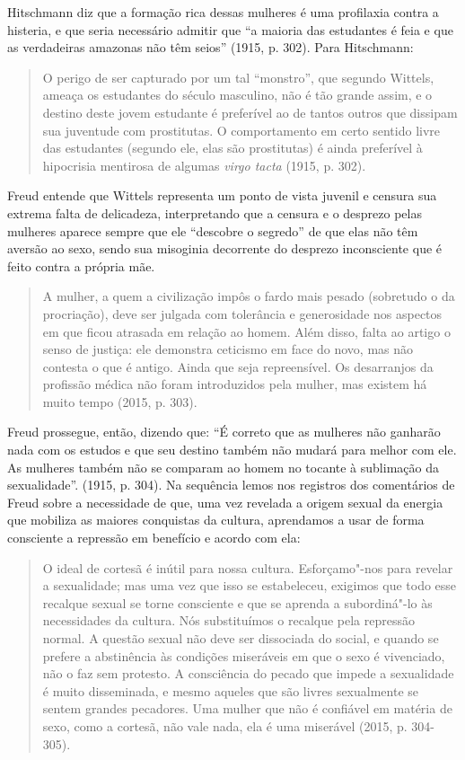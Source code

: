 Hitschmann diz que a formação rica dessas mulheres é uma profilaxia
contra a histeria, e que seria necessário admitir que ``a maioria das
estudantes é feia e que as verdadeiras amazonas não têm seios'' (1915,
p. 302). Para Hitschmann:

\begin{quote}
O perigo de ser capturado por um tal ``monstro'', que segundo Wittels,
ameaça os estudantes do século masculino, não é tão grande assim, e o
destino deste jovem estudante é preferível ao de tantos outros que
dissipam sua juventude com prostitutas. O comportamento em certo sentido
livre das estudantes (segundo ele, elas são prostitutas) é ainda
preferível à hipocrisia mentirosa de algumas \emph{virgo tacta} (1915, p. 302).
\end{quote}

Freud entende que Wittels representa um ponto de vista juvenil e censura
sua extrema falta de delicadeza, interpretando que a censura e o
desprezo pelas mulheres aparece sempre que ele ``descobre o segredo'' de
que elas não têm aversão ao sexo, sendo sua misoginia decorrente do
desprezo inconsciente que é feito contra a própria mãe.

\begin{quote}
A mulher, a quem a civilização impôs o fardo mais pesado (sobretudo o da
procriação), deve ser julgada com tolerância e generosidade nos aspectos
em que ficou atrasada em relação ao homem. Além disso, falta ao artigo o
senso de justiça: ele demonstra ceticismo em face do novo, mas não
contesta o que é antigo. Ainda que seja repreensível. Os desarranjos da
profissão médica não foram introduzidos pela mulher, mas existem há
muito tempo (2015, p. 303).
\end{quote}

Freud prossegue, então, dizendo que: ``É correto que as mulheres não
ganharão nada com os estudos e que seu destino também não mudará para
melhor com ele. As mulheres também não se comparam ao homem no tocante à
sublimação da sexualidade''. (1915, p. 304). Na sequência lemos nos
registros dos comentários de Freud sobre a necessidade de que, uma vez
revelada a origem sexual da energia que mobiliza as maiores conquistas
da cultura, aprendamos a usar de forma consciente a repressão em
benefício e acordo com ela:

\begin{quote}
O ideal de cortesã é inútil para nossa cultura. Esforçamo"-nos para
revelar a sexualidade; mas uma vez que isso se estabeleceu, exigimos que
todo esse recalque sexual se torne consciente e que se aprenda a
subordiná"-lo às necessidades da cultura. Nós substituímos o recalque
pela repressão normal. A questão sexual não deve ser dissociada do
social, e quando se prefere a abstinência às condições miseráveis em que
o sexo é vivenciado, não o faz sem protesto. A consciência do pecado que
impede a sexualidade é muito disseminada, e mesmo aqueles que são livres
sexualmente se sentem grandes pecadores. Uma mulher que não é confiável
em matéria de sexo, como a cortesã, não vale nada, ela é uma miserável
(2015, p. 304-305).
\end{quote}

